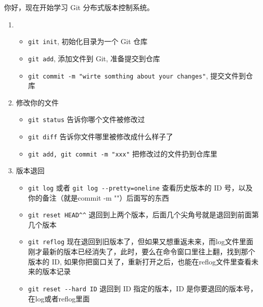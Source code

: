 \documentclass[UTF8]{ctexart}
\begin{document}
你好，现在开始学习 Git 分布式版本控制系统。\par
\begin{enumerate}
  \item
  \begin{itemize}
    \item \verb|git init|, 初始化目录为一个 Git 仓库
    \item \verb|git add|, 添加文件到 Git, 准备提交到仓库
    \item \verb|git commit -m "wirte somthing about your changes"|, 提交文件到仓库
  \end{itemize}
  \item 修改你的文件
  \begin{itemize}
    \item \verb|git status| 告诉你哪个文件被修改过
    \item \verb|git diff| 告诉你文件哪里被修改成什么样子了
    \item \verb|git add, git commit -m "xxx"| 把修改过的文件扔到仓库里
  \end{itemize}
  \item 版本退回
  \begin{itemize}
    \item \verb|git log| 或者 \verb|git log --pretty=oneline| 查看历史版本的 ID 号，以及你的备注（就是commit -m ""）后面写的东西
    \item \verb|git reset HEAD^^| 退回到上两个版本，后面几个尖角号就是退回到前面第几个版本
    \item \verb|git reflog| 现在退回到旧版本了，但如果又想重返未来，而log文件里面刚才最新的版本已经消失了，此时，要么在命令窗口里往上翻，找到那个版本的 ID, 如果你把窗口关了，重新打开之后，也能在reflog文件里查看未来的版本记录
    \item \verb|git reset --hard ID| 退回到 ID 指定的版本，ID 是你要退回的版本号，在log或者reflog里面
  \end{itemize}
\end{enumerate}
\end{document}
